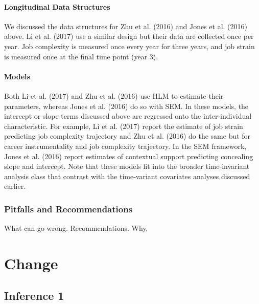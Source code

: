 \documentclass[english,,man]{apa6}
\let\oldparagraph\paragraph
\renewcommand{\paragraph}[1]{\oldparagraph{#1}\mbox{}}
\theoremstyle{definition}
\theoremstyle{definition}
\theoremstyle{definition}
\theoremstyle{remark}
\begin{document}
\hypertarget{longitudinal-data-structures}{%
\paragraph{Longitudinal Data
Structures}\label{longitudinal-data-structures}}

We discussed the data structures for Zhu et al. (2016) and Jones et al.
(2016) above. Li et al. (2017) use a similar design but their data are
collected once per year. Job complexity is measured once every year for
three years, and job strain is measured once at the final time point
(year 3).

\hypertarget{models-5}{%
\paragraph{Models}\label{models-5}}

Both Li et al. (2017) and Zhu et al. (2016) use HLM to estimate their
parameters, whereas Jones et al. (2016) do so with SEM. In these models,
the intercept or slope terms discussed above are regressed onto the
inter-individual characteristic. For example, Li et al. (2017) report
the estimate of job strain predicting job complexity trajectory and Zhu
et al. (2016) do the same but for career instrumentality and job
complexity trajectory. In the SEM framework, Jones et al. (2016) report
estimates of contextual support predicting concealing slope and
intercept. Note that these models fit into the broader time-invariant
analysis class that contrast with the time-variant covariates analyses
discussed earlier.

\hypertarget{pitfalls-and-recommendations-5}{%
\subsubsection{Pitfalls and
Recommendations}\label{pitfalls-and-recommendations-5}}

What can go wrong. Recommendations. Why.

\hypertarget{change}{%
\section{Change}\label{change}}

\hypertarget{inference-1-1}{%
\subsection{Inference 1}\label{inference-1-1}}
\end{document}
